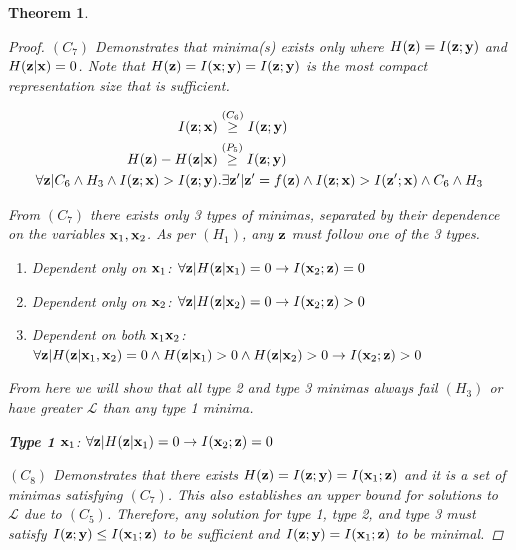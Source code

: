 \documentclass{article} %
\theoremstyle{plain}
\newtheorem{theorem}{Theorem}[section]
\theoremstyle{definition}
\theoremstyle{remark}
\begin{document}
\begin{theorem}
\begin{proof}
$(C_7)$ Demonstrates that minima(s) exists only where $H({\mathbf{z}}) = I({\mathbf{z}}; {\mathbf{y}})$ and $H({\mathbf{z}}| {\mathbf{x}}) = 0$. Note that $H({\mathbf{z}}) = I({\mathbf{x}}; {\mathbf{y}}) = I({\mathbf{z}}; {\mathbf{y}})$ is the most compact representation size that is sufficient. 

$$
\begin{aligned}
    I({\mathbf{z}};{\mathbf{x}}) &\stackrel{\left(C_6\right)}{\geq} I({\mathbf{z}}; {\mathbf{y}}) \\
    H({\mathbf{z}}) - H({\mathbf{z}}| {\mathbf{x}})  &\stackrel{\left(P_5\right)}{\geq} I({\mathbf{z}}; {\mathbf{y}})\\
    \forall {\mathbf{z}} | C_6 \land H_3 \land I({\mathbf{z}}; {\mathbf{x}}) > I({\mathbf{z}}; {\mathbf{y}}) &. \exists {\mathbf{z}}'|{\mathbf{z}}' = f({\mathbf{z}}) \land I({\mathbf{z}}; {\mathbf{x}}) > I({\mathbf{z}}'; {\mathbf{x}}) \land C_6 \land H_3
\end{aligned}
$$

From $(C_7)$ there exists only 3 types of minimas, separated by their dependence on the variables  ${\mathbf{x}}_1, {\mathbf{x}}_2$. As per $(H_1)$, any ${\mathbf{z}}$ must follow one of the 3 types. 

\begin{enumerate}
    \item Dependent only on ${\mathbf{x}}_1$: $\forall {\mathbf{z}}|H({\mathbf{z}}|{\mathbf{x}}_1)=0 \rightarrow I({\mathbf{x}}_2; {\mathbf{z}}) = 0$
    
    \item Dependent only on ${\mathbf{x}}_2$: $\forall {\mathbf{z}}|H({\mathbf{z}}| {\mathbf{x}}_2)=0 \rightarrow I({\mathbf{x}}_2; {\mathbf{z}}) > 0$
    
    \item Dependent on both ${\mathbf{x}}_1 {\mathbf{x}}_2$: $\forall {\mathbf{z}}|H({\mathbf{z}}|{\mathbf{x}}_1, {\mathbf{x}}_2)=0 \land H({\mathbf{z}}| {\mathbf{x}}_1)>0 \land H({\mathbf{z}}| {\mathbf{x}}_2)>0 \rightarrow I({\mathbf{x}}_2; {\mathbf{z}}) > 0$
\end{enumerate}

From here we will show that all type 2 and type 3 minimas always fail $(H_3)$ or have greater $\mathcal{L}$ than any type 1 minima. 

\textbf{Type 1} ${\mathbf{x}}_1$: $\forall {\mathbf{z}}|H({\mathbf{z}}| {\mathbf{x}}_1)=0 \rightarrow I({\mathbf{x}}_2; {\mathbf{z}}) = 0$

$(C_8)$ Demonstrates that there exists $H({\mathbf{z}}) = I({\mathbf{z}}; {\mathbf{y}}) = I({\mathbf{x}}_1; {\mathbf{z}})$ and it is a set of minimas satisfying $(C_7)$. This also establishes an upper bound for solutions to $\mathcal{L}$ due to $(C_5)$. Therefore, any solution for type 1, type 2, and type 3 must satisfy $I({\mathbf{z}}; {\mathbf{y}}) \leq I({\mathbf{x}}_1; {\mathbf{z}})$ to be sufficient and $I({\mathbf{z}}; {\mathbf{y}}) = I({\mathbf{x}}_1; {\mathbf{z}})$ to be minimal.


\end{proof}
\end{theorem}
\end{document}
